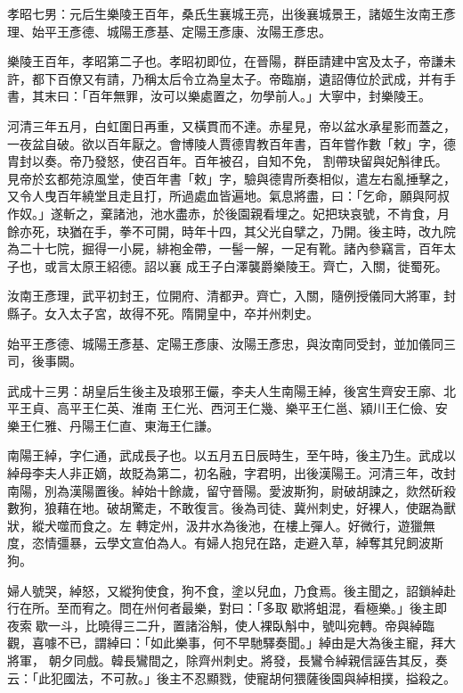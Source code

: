 \begin{pinyinscope}
 孝昭七男：元后生樂陵王百年，桑氏生襄城王亮，出後襄城景王，諸姬生汝南王彥理、始平王彥德、城陽王彥基、定陽王彥康、汝陽王彥忠。



 樂陵王百年，孝昭第二子也。孝昭初即位，在晉陽，群臣請建中宮及太子，帝謙未許，都下百僚又有請，乃稱太后令立為皇太子。帝臨崩，遺詔傳位於武成，并有手書，其末曰：「百年無罪，汝可以樂處置之，勿學前人。」大寧中，封樂陵王。



 河清三年五月，白虹圍日再重，又橫貫而不達。赤星見，帝以盆水承星影而蓋之，一夜盆自破。欲以百年厭之。會博陵人賈德胄教百年書，百年嘗作數「敕」字，德胄封以奏。帝乃發怒，使召百年。百年被召，自知不免，
 割帶玦留與妃斛律氏。見帝於玄都苑涼風堂，使百年書「敕」字，驗與德胄所奏相似，遣左右亂捶擊之，又令人曳百年繞堂且走且打，所過處血皆遍地。氣息將盡，曰：「乞命，願與阿叔作奴。」遂斬之，棄諸池，池水盡赤，於後園親看埋之。妃把玦哀號，不肯食，月餘亦死，玦猶在手，拳不可開，時年十四，其父光自擘之，乃開。後主時，改九院為二十七院，掘得一小屍，緋袍金帶，一髻一解，一足有靴。諸內參竊言，百年太子也，或言太原王紹德。詔以襄
 成王子白澤襲爵樂陵王。齊亡，入關，徙蜀死。



 汝南王彥理，武平初封王，位開府、清都尹。齊亡，入關，隨例授儀同大將軍，封縣子。女入太子宮，故得不死。隋開皇中，卒并州刺史。



 始平王彥德、城陽王彥基、定陽王彥康、汝陽王彥忠，與汝南同受封，並加儀同三司，後事闕。



 武成十三男：胡皇后生後主及琅邪王儼，李夫人生南陽王綽，後宮生齊安王廓、北平王貞、高平王仁英、淮南
 王仁光、西河王仁幾、樂平王仁邕、潁川王仁儉、安樂王仁雅、丹陽王仁直、東海王仁謙。



 南陽王綽，字仁通，武成長子也。以五月五日辰時生，至午時，後主乃生。武成以綽母李夫人非正嫡，故貶為第二，初名融，字君明，出後漢陽王。河清三年，改封南陽，別為漢陽置後。綽始十餘歲，留守晉陽。愛波斯狗，尉破胡諫之，欻然斫殺數狗，狼藉在地。破胡驚走，不敢復言。後為司徒、冀州刺史，好裸人，使踞為獸狀，縱犬噬而食之。左
 轉定州，汲井水為後池，在樓上彈人。好微行，遊獵無度，恣情彊暴，云學文宣伯為人。有婦人抱兒在路，走避入草，綽奪其兒飼波斯狗。



 婦人號哭，綽怒，又縱狗使食，狗不食，塗以兒血，乃食焉。後主聞之，詔鎖綽赴行在所。至而宥之。問在州何者最樂，對曰：「多取歇將蛆混，看極樂。」後主即夜索歇一斗，比曉得三二升，置諸浴斛，使人裸臥斛中，號叫宛轉。帝與綽臨觀，喜噱不已，謂綽曰：「如此樂事，何不早馳驛奏聞。」綽由是大為後主寵，拜大將軍，
 朝夕同戲。韓長鸞間之，除齊州刺史。將發，長鸞令綽親信誣告其反，奏云：「此犯國法，不可赦。」後主不忍顯戮，使寵胡何猥薩後園與綽相撲，搤殺之。




\end{pinyinscope}
